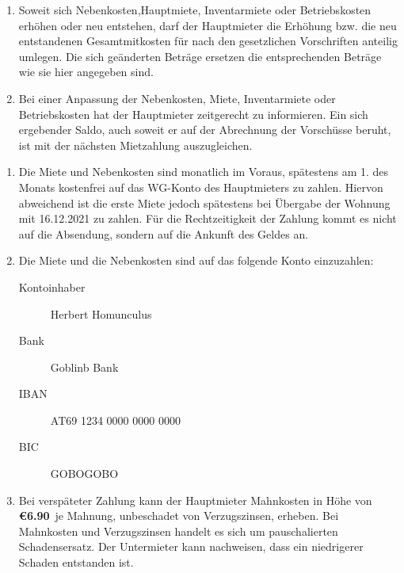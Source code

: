 \documentclass{scrreprt}[12pt,a4paper,twoside,duplex]
\newcommand{\hauptmieterName}{Herbert Homunculus}
\newcommand{\hauptmieterBankname}{Goblinb Bank}
\newcommand{\hauptmieterIBAN}{AT69 1234 0000 0000 0000}
\newcommand{\hauptmieterBIC}{GOBOGOBO}
\newcommand{\mahnkosten}{\euro{6.90}}
\begin{document}
\begin{contract}
\begin{enumerate}
 	\item Soweit sich Nebenkosten,Hauptmiete, Inventarmiete oder Betriebskosten erhöhen oder neu entstehen, darf der
	Hauptmieter die Erhöhung bzw. die neu entstandenen Gesamtmitkosten für  nach den
	gesetzlichen Vorschriften anteilig umlegen. Die sich geänderten Beträge ersetzen die entsprechenden Beträge wie sie hier angegeben sind.

	\item Bei einer Anpassung der Nebenkosten, Miete, Inventarmiete oder Betriebskosten hat der Hauptmieter  zeitgerecht zu informieren. Ein sich ergebender Saldo, auch soweit er auf der Abrechnung der Vorschüsse beruht, ist mit der nächsten Mietzahlung auszugleichen.
\end{enumerate}
\end{contract}

\begin{contract}
\label{clause:zahlungMiete}
\begin{enumerate}
    \item Die Miete und Nebenkosten sind monatlich im Voraus, spätestens am 1. des Monats kostenfrei auf das WG-Konto des Hauptmieters zu zahlen. Hiervon abweichend ist die erste Miete jedoch spätestens bei Übergabe der Wohnung  mit 16.12.2021 zu zahlen. Für die Rechtzeitigkeit der Zahlung kommt es nicht auf die Absendung, sondern auf die Ankunft des Geldes an.

	\item Die Miete und die Nebenkosten sind auf das folgende Konto einzuzahlen:
		\begin{description}
		  \item[Kontoinhaber] \hauptmieterName
		  \item[Bank] \hauptmieterBankname
		  \item[IBAN] \hauptmieterIBAN
		  \item[BIC] \hauptmieterBIC
		\end{description}

    \item Bei verspäteter Zahlung kann der Hauptmieter Mahnkosten in Höhe von \textbf{ \mahnkosten}\ je Mahnung, unbeschadet von Verzugszinsen, erheben. Bei Mahnkosten und Verzugszinsen handelt es sich um pauschalierten Schadensersatz. Der Untermieter kann nachweisen, dass ein niedrigerer Schaden entstanden ist.
\end{enumerate}
\end{contract}
\end{document}
